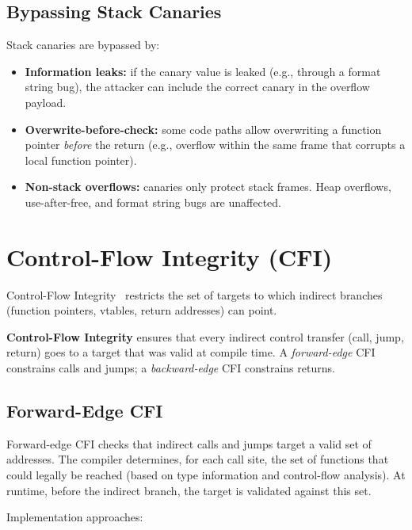 \subsection{Bypassing Stack Canaries}

Stack canaries are bypassed by:

\begin{itemize}
	\item \textbf{Information leaks:} if the canary value is leaked (e.g., through a format string bug), the attacker can include the correct canary in the overflow payload.
	\item \textbf{Overwrite-before-check:} some code paths allow overwriting a function pointer \emph{before} the return (e.g., overflow within the same frame that corrupts a local function pointer).
	\item \textbf{Non-stack overflows:} canaries only protect stack frames. Heap overflows, use-after-free, and format string bugs are unaffected.
\end{itemize}

\section{Control-Flow Integrity (CFI)}

Control-Flow Integrity~\cite{abadi2005cfi} restricts the set of targets to which indirect branches (function pointers, vtables, return addresses) can point.

\begin{definition}[CFI]
	\textbf{Control-Flow Integrity} ensures that every indirect control transfer (call, jump, return) goes to a target that was valid at compile time. A \emph{forward-edge} CFI constrains calls and jumps; a \emph{backward-edge} CFI constrains returns.
\end{definition}

\subsection{Forward-Edge CFI}

Forward-edge CFI checks that indirect calls and jumps target a valid set of addresses. The compiler determines, for each call site, the set of functions that could legally be reached (based on type information and control-flow analysis). At runtime, before the indirect branch, the target is validated against this set.

Implementation approaches:

